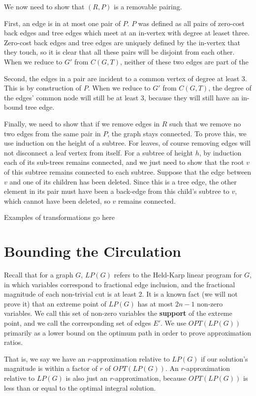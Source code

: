 \documentclass[12pt]{article}
\begin{document}
We now need to show that $(R, P)$ is a removable pairing.

First, an edge is in at most one pair of $P$.  $P$ was defined as all pairs of
zero-cost back edges and tree edges which meet at an in-vertex with degree at
leaset three.  Zero-cost back edges and tree edges are uniquely defined by the
in-vertex that they touch, so it is clear that all these pairs will be disjoint
from each other.  When we reduce to $G'$ from $C(G, T)$, neither of these two
edges are part of the 

Second, the edges in a pair are incident to a common vertex of degree at least
$3$.  This is by construction of $P$.  When we reduce to $G'$ from $C(G,T)$,  the
degree of the edges' common node will still be at least $3$, because they will
still have an in-bound tree edge.

Finally, we need to show that if we remove edges in $R$ such that we remove no
two edges from the same pair in $P$, the graph stays connected.  To prove this,
we use induction on the height of a subtree.  For leaves, of course removing
edges will not disconnect a leaf vertex from itself.  For a subtree of height
$h$, by induction each of its sub-trees remains connected, and we just need to
show that the root $v$ of this subtree remains connected to each subtree.  Suppose
that the edge between $v$ and one of its children has been deleted.  Since this
is a tree edge, the other element in its pair must have been a back-edge from
this child's subtree to $v$, which cannot have been deleted, so $v$ remains
connected.

Examples of transformations go here

\section{Bounding the Circulation}

Recall that for a graph $G$, $LP(G)$ refers to the Held-Karp linear program for
$G$, in which variables correspond to fractional edge inclusion, and the
fractional magnitude of each non-trivial cut is at least 2.  It is a known fact
(we will not prove it) that an extreme point of $LP(G)$ has at most $2n-1$
non-zero variables.  We call this set of non-zero variables the {\bf support} of
the extreme point, and we call the corresponding set of edges $E'$.  We use
$OPT(LP(G))$ primarily as a lower bound on the optimum path in order to prove
approximation ratios.

That is, we say we have an $r$-approximation relative to $LP(G)$ if our
solution's  magnitude is within a factor of $r$ of $OPT(LP(G))$.  An
$r$-approximation relative to $LP(G)$ is also just an $r$-approximation, because
$OPT(LP(G))$ is less than or equal to the optimal integral solution.
\end{document}
